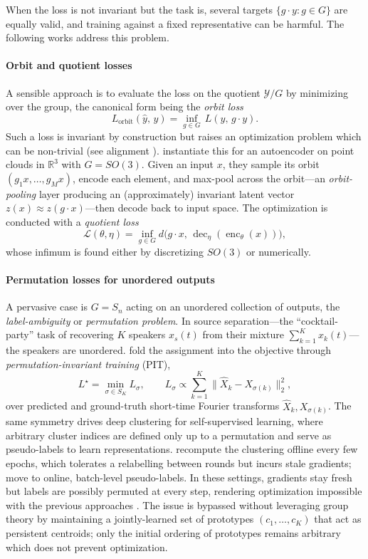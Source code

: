 \documentclass[mathematics,review,submit,moreauthors]{Definitions/mdpi}
\begin{document}
When the loss is not invariant but the task is, several targets $\{g\cdot y:g\in G\}$ are equally valid, and training against a fixed representative can be harmful.
The following works address this problem.

\paragraph{Orbit and quotient losses}
A sensible approach is to evaluate the loss on the quotient $\mathcal{Y}/G$ by minimizing over the group, the canonical form being the \emph{orbit loss}
$$
L_{\mathrm{orbit}}(\hat y,\, y) = \inf_{g\in G}\, L(\hat y,\, g\cdot y).
$$
Such a loss is invariant by construction but raises an optimization problem which can be non-trivial (see alignment ).
\citet{mehr20182iccvpr} instantiate this for an autoencoder on point clouds in $\mathbb{R}^3$ with $G=SO(3)$.
Given an input $x$, they sample its orbit $(g_1 x,\dots,g_M x)$, encode each element, and max-pool across the orbit---an \emph{orbit-pooling} layer producing an (approximately) invariant latent vector $z(x)\approx z(g\cdot x)$---then decode back to input space.
The optimization is conducted with a \emph{quotient loss} $$\mathcal{L}(\theta, \eta)=\inf_{g\in G} d\big(g\cdot x,\,\operatorname{dec}_\eta(\operatorname{enc}_\theta(x))\big),$$ whose infimum is found either by discretizing $SO(3)$ or numerically.

\paragraph{Permutation losses for unordered outputs}
A pervasive case is $G=S_n$ acting on an unordered collection of outputs, the \emph{label-ambiguity} or \emph{permutation problem}.
In source separation---the ``cocktail-party'' task of recovering $K$ speakers $x_s(t)$ from their mixture $\sum_{k=1}^K x_k(t)$---the speakers are unordered.
\citet{yu20172iicasspi} fold the assignment into the objective through \emph{permutation-invariant training} (PIT),
$$
L^\star = \min_{\sigma\in S_K} L_\sigma, \qquad L_\sigma \propto \sum_{k=1}^K \big\|\hat X_k - X_{\sigma(k)}\big\|_2^2,
$$
over predicted and ground-truth short-time Fourier transforms $\hat X_k, X_{\sigma(k)}$.
The same symmetry drives deep clustering for self-supervised learning, where arbitrary cluster indices are defined only up to a permutation and serve as pseudo-labels to learn representations.
\citet{caron2018,caron2019} recompute the clustering offline every few epochs, which tolerates a relabelling between rounds but incurs stale gradients; \citet{caron2020anips} move to online, batch-level pseudo-labels.
In these settings, gradients stay fresh but labels are possibly permuted at every step, rendering optimization impossible with the previous approaches \citep{caron2018,caron2019}.
The issue is bypassed without leveraging group theory by maintaining a jointly-learned set of prototypes $(c_1,\dots,c_K)$ that act as persistent centroids; only the initial ordering of prototypes remains arbitrary which does not prevent optimization.
\end{document}
